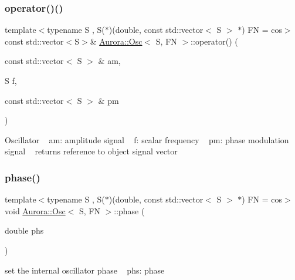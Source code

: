 \subsubsection{\texorpdfstring{operator()()}{operator()()}\hspace{0.1cm}{\footnotesize\ttfamily [6/6]}}
{\footnotesize\ttfamily template$<$typename S , S($\ast$)(double, const std\+::vector$<$ S $>$ $\ast$) FN = cos$>$ \\
const std\+::vector$<$S$>$\& \hyperlink{class_aurora_1_1_osc}{Aurora\+::\+Osc}$<$ S, FN $>$\+::operator() (\begin{DoxyParamCaption}\item[{const std\+::vector$<$ S $>$ \&}]{am,  }\item[{S}]{f,  }\item[{const std\+::vector$<$ S $>$ \&}]{pm }\end{DoxyParamCaption})\hspace{0.3cm}{\ttfamily [inline]}}

Oscillator ~\newline
am\+: amplitude signal ~\newline
f\+: scalar frequency ~\newline
pm\+: phase modulation signal ~\newline
returns reference to object signal vector \mbox{\label{class_aurora_1_1_osc_a93770f94cde427c999be8a7b6c8a1cc9}} 
\subsubsection{\texorpdfstring{phase()}{phase()}}
{\footnotesize\ttfamily template$<$typename S , S($\ast$)(double, const std\+::vector$<$ S $>$ $\ast$) FN = cos$>$ \\
void \hyperlink{class_aurora_1_1_osc}{Aurora\+::\+Osc}$<$ S, FN $>$\+::phase (\begin{DoxyParamCaption}\item[{double}]{phs }\end{DoxyParamCaption})\hspace{0.3cm}{\ttfamily [inline]}}

set the internal oscillator phase ~\newline
phs\+: phase \mbox{\label{class_aurora_1_1_osc_a9537710c678ff70707c340343534ac58}} 
